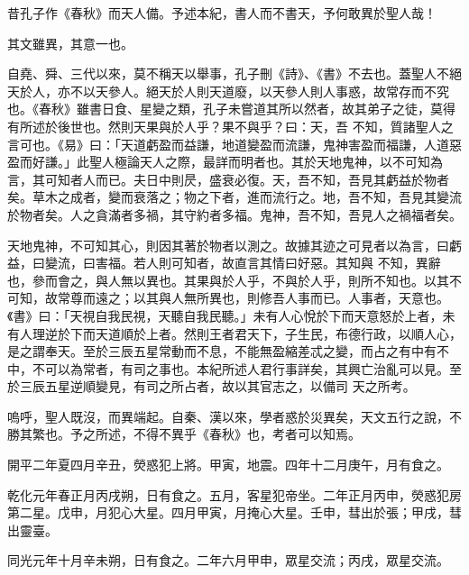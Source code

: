 
\begin{pinyinscope}

 昔孔子作《春秋》而天人備。予述本紀，書人而不書天，予何敢異於聖人哉！



 其文雖異，其意一也。



 自堯、舜、三代以來，莫不稱天以舉事，孔子刪《詩》、《書》不去也。蓋聖人不絕天於人，亦不以天參人。絕天於人則天道廢，以天參人則人事惑，故常存而不究也。《春秋》雖書日食、星變之類，孔子未嘗道其所以然者，故其弟子之徒，莫得有所述於後世也。然則天果與於人乎？果不與乎？曰：天，吾
 不知，質諸聖人之言可也。《易》曰：「天道虧盈而益謙，地道變盈而流謙，鬼神害盈而福謙，人道惡盈而好謙。」此聖人極論天人之際，最詳而明者也。其於天地鬼神，以不可知為言，其可知者人而已。夫日中則昃，盛衰必復。天，吾不知，吾見其虧益於物者矣。草木之成者，變而衰落之；物之下者，進而流行之。地，吾不知，吾見其變流於物者矣。人之貪滿者多禍，其守約者多福。鬼神，吾不知，吾見人之禍福者矣。



 天地鬼神，不可知其心，則因其著於物者以測之。故據其迹之可見者以為言，曰虧益，曰變流，曰害福。若人則可知者，故直言其情曰好惡。其知與
 不知，異辭也，參而會之，與人無以異也。其果與於人乎，不與於人乎，則所不知也。以其不可知，故常尊而遠之；以其與人無所異也，則修吾人事而已。人事者，天意也。《書》曰：「天視自我民視，天聽自我民聽。」未有人心悅於下而天意怒於上者，未有人理逆於下而天道順於上者。然則王者君天下，子生民，布德行政，以順人心，是之謂奉天。至於三辰五星常動而不息，不能無盈縮差忒之變，而占之有中有不中，不可以為常者，有司之事也。本紀所述人君行事詳矣，其興亡治亂可以見。至於三辰五星逆順變見，有司之所占者，故以其官志之，以備司
 天之所考。



 嗚呼，聖人既沒，而異端起。自秦、漢以來，學者惑於災異矣，天文五行之說，不勝其繁也。予之所述，不得不異乎《春秋》也，考者可以知焉。



 開平二年夏四月辛丑，熒惑犯上將。甲寅，地震。四年十二月庚午，月有食之。



 乾化元年春正月丙戌朔，日有食之。五月，客星犯帝坐。二年正月丙申，熒惑犯房第二星。戊申，月犯心大星。四月甲寅，月掩心大星。壬申，彗出於張；甲戌，彗出靈臺。



 同光元年十月辛未朔，日有食之。二年六月甲申，眾星交流；丙戌，眾星交流。




\end{pinyinscope}
